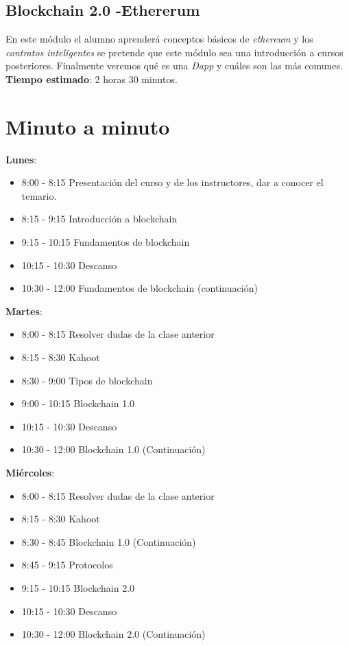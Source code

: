 \documentclass[a4paper,12pt]{lib/pub}
\begin{document}
\subsection{Blockchain 2.0 -Ethererum}
En este módulo el alumno aprenderá conceptos básicos de \textit{ethereum} y los \textit{contratos inteligentes} se pretende que este módulo sea una introducción a cursos posteriores. Finalmente veremos qué es una \textit{Dapp} y cuáles son las más comunes.\\
\textbf{Tiempo estimado}: 2 horas 30 minutos.

\section{Minuto a minuto}
\textbf{Lunes}:
\begin{itemize}
	\item 8:00 - 8:15 Presentación del curso y de los instructores, dar a conocer el temario.
	\item 8:15 - 9:15 Introducción a blockchain
	\item 9:15 - 10:15 Fundamentos de blockchain
	\item 10:15 - 10:30 Descanso
	\item 10:30 - 12:00 Fundamentos de blockchain (continuación)
\end{itemize}
\textbf{Martes}:
\begin{itemize}
	\item 8:00 - 8:15 Resolver dudas de la clase anterior
	\item 8:15 - 8:30 Kahoot
	\item 8:30 - 9:00 Tipos de blockchain
	\item 9:00 - 10:15  Blockchain 1.0
	\item 10:15 - 10:30 Descanso
	\item 10:30 - 12:00 Blockchain 1.0 (Continuación)
\end{itemize}
\textbf{Miércoles}:
\begin{itemize}
	\item 8:00 - 8:15 Resolver dudas de la clase anterior
	\item 8:15 - 8:30 Kahoot
	\item 8:30 - 8:45 Blockchain 1.0 (Continuación)
	\item 8:45 - 9:15 Protocolos
	\item 9:15 - 10:15 Blockchain 2.0
	\item 10:15 - 10:30 Descanso
	\item 10:30 - 12:00 Blockchain 2.0 (Continuación)
\end{itemize}
\end{document}
